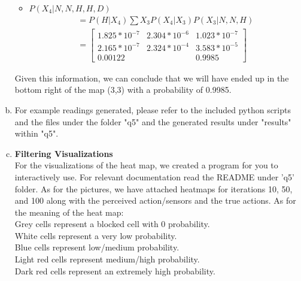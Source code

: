 \documentclass{article}
\begin{document}
\begin{enumerate}[a)]
\begin{itemize}
        \item $P(X_4 | N, N, H, H, D)$
        \begin{gather*}
            = P(H|X_4)\sum{X_3}P(X_4|X_3)P(X_3|N, N, H) \\
            =
            \begin{bmatrix}
                1.825 * 10^{-7} & 2.304 * 10^{-6} & 1.023 * 10^{-7}\\
                2.165 * 10^{-7} & 2.324 * 10^{-4} & 3.583 * 10^{-5}\\
                0.00122 & & 0.9985
            \end{bmatrix}
        \end{gather*}
    \end{itemize}
    Given this information, we can conclude that we will have ended up in the bottom right of
    the map (3,3) with a probability of 0.9985.
    
    \item For example readings generated, please refer to the included python scripts and the
        files under the folder "q5" and the generated results under "results" within "q5".
    \clearpage
    \item \textbf{Filtering Visualizations}\\
        For the visualizations of the heat map, we created a program for you to interactively use.
        For relevant documentation read the README under 'q5' folder. As for the pictures, we have
        attached heatmaps for iterations 10, 50, and 100 along with the perceived action/sensors and
        the true actions. As for the meaning of the heat map:\\
        Grey cells represent a blocked cell with 0 probability.\\
        White cells represent a very low probability.\\
        Blue cells represent low/medium probability.\\
        Light red cells represent medium/high probability.\\
        Dark red cells represent an extremely high probability.
\end{enumerate}
\end{document}
